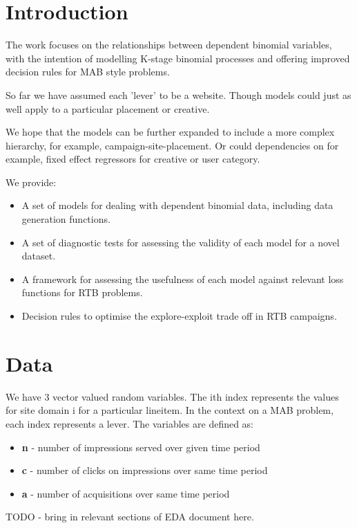 \documentclass[12pt]{article}
\date{}
\begin{document}
\tableofcontents
\pagebreak

\section{Introduction}

The work focuses on the relationships between dependent binomial variables, with the intention of modelling K-stage binomial processes and offering improved decision rules for MAB style problems.

So far we have assumed each 'lever' to be a website. Though models could just as well apply to a particular placement or creative.

We hope that the models can be further expanded to include a more complex hierarchy, for example, campaign-site-placement. Or could dependencies on for example, fixed effect regressors for creative or user category.

We provide:
\begin{itemize}
	\item A set of models for dealing with dependent binomial data, including data generation functions.
	\item A set of diagnostic tests for assessing the validity of each model for a novel dataset.
	\item A framework for assessing the usefulness of each model against relevant loss functions for RTB problems.
	\item Decision rules to optimise the explore-exploit trade off in RTB campaigns.
\end{itemize}


\section{Data}

We have 3 vector valued random variables. The ith index represents the values for site domain i for a particular lineitem. In the context on a MAB problem, each index represents a lever. The variables are defined as:
\begin{itemize}
	\item \textbf{n} - number of impressions served over given time period
	\item \textbf{c} - number of clicks on impressions over same time period 
	\item \textbf{a} - number of acquisitions over same time period
\end{itemize}

TODO - bring in relevant sections of EDA document here.
\end{document}
